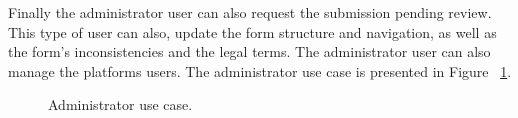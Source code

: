 Finally the administrator user can also request the submission pending review.
This type of user can also, update the form structure and navigation, as well as the form's inconsistencies and the legal terms.
The administrator user can also manage the platforms users.
The administrator use case is presented in Figure ~\ref{fig:administrator_use_case}.
\begin{figure}[h]
	\begin{center}
	\end{center}
	\caption{Administrator use case.}\label{fig:administrator_use_case}
\end{figure}
